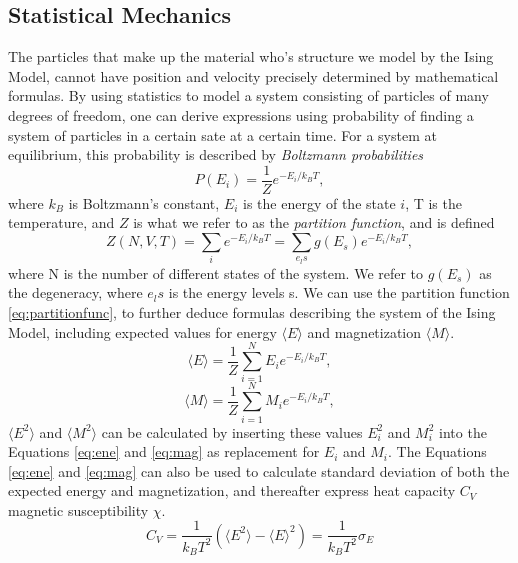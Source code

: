 \documentclass[10pt, nofootinbib, twocolumn]{revtex4-1}
\begin{document}
\subsection{Statistical Mechanics}
The particles that make up the material who's structure we model by the Ising Model, cannot have position and velocity precisely determined by mathematical formulas. By using statistics to model a system consisting of particles of many degrees of freedom, one can derive expressions using probability of finding a system of particles in a certain sate at a certain time. For a system at equilibrium, this probability is described by \textit{Boltzmann probabilities} \cite[p.~184]{stats}
\begin{equation}
    P(E_i)= \frac{1}{Z}e^{-E_i/k_BT}, \label{eq:probfunc}
\end{equation}
where $k_B$ is Boltzmann's constant, $E_i$ is the energy of the state $i$, T is the temperature, and $Z$ is what we refer to as the \textit{partition function}, and is defined
\begin{equation}
    Z(N,V,T)= \sum_{i}e^{-E_i/k_BT} = \sum_{e_l s}g(E_s)e^{-E_i/k_BT} , \label{eq:partitionfunc}
\end{equation}
where N is the number of different states of the system. We refer to $g(E_s)$ as the degeneracy, where $e_l s$ is the energy levels s.
We can use the partition function \eqref{eq:partitionfunc}, to further deduce formulas describing the system of the Ising Model, including expected values for energy $\langle E \rangle$ and magnetization $\langle M \rangle$.
\begin{equation}
    \langle E \rangle = \frac{1}{Z}\sum_{i=1}^{N}E_ie^{-E_i/k_BT}, \label{eq:ene}
\end{equation}
\begin{equation}
     \langle M \rangle = \frac{1}{Z}\sum_{i=1}^{N}M_ie^{-E_i/k_BT}, \label{eq:mag}
\end{equation}
$\langle E^2 \rangle $ and $\langle M^2 \rangle$ can be calculated by inserting these values $E_i^2$ and $M_i^2$ into the Equations \eqref{eq:ene} and \eqref{eq:mag} as replacement for $E_i$ and $M_i$. The Equations \eqref{eq:ene} and \eqref{eq:mag} can also be used to calculate standard deviation of both the expected energy and magnetization, and thereafter express heat capacity $C_V$ magnetic susceptibility $\chi$. 
\begin{equation}
    C_V = \frac{1}{k_B T^2}(\langle E^2 \rangle - \langle E \rangle^2) = \frac{1}{k_B T^2} \sigma_E \label{eq:heat}
\end{equation}
\end{document}
